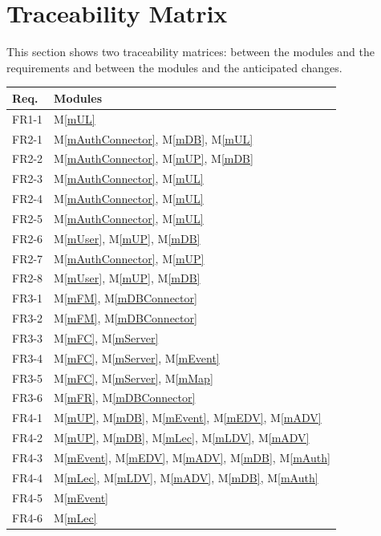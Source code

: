 \documentclass[12pt, titlepage]{article}
\newcommand{\mref}[1]{M\ref{#1}}
\begin{document}
\section{Traceability Matrix} \label{SecTM}

This section shows two traceability matrices: between the modules and the
requirements and between the modules and the anticipated changes.

\begin{table}[H]
\centering
\begin{tabular}{p{} p{}}
\toprule
\textbf{Req.} & \textbf{Modules}\\
\midrule
FR1-1 & \mref{mUL}\\
FR2-1 & \mref{mAuthConnector}, \mref{mDB}, \mref{mUL}\\
FR2-2 & \mref{mAuthConnector}, \mref{mUP}, \mref{mDB}\\
FR2-3 & \mref{mAuthConnector}, \mref{mUL}\\
FR2-4 & \mref{mAuthConnector}, \mref{mUL}\\
FR2-5 & \mref{mAuthConnector}, \mref{mUL}\\
FR2-6 & \mref{mUser}, \mref{mUP}, \mref{mDB}\\
FR2-7 & \mref{mAuthConnector}, \mref{mUP}\\
FR2-8 & \mref{mUser}, \mref{mUP}, \mref{mDB}\\
FR3-1 & \mref{mFM}, \mref{mDBConnector}\\
FR3-2 & \mref{mFM}, \mref{mDBConnector}\\
FR3-3 & \mref{mFC}, \mref{mServer}\\
FR3-4 & \mref{mFC}, \mref{mServer}, \mref{mEvent}\\
FR3-5 & \mref{mFC}, \mref{mServer}, \mref{mMap}\\
FR3-6 & \mref{mFR}, \mref{mDBConnector}\\
FR4-1 & \mref{mUP}, \mref{mDB}, \mref{mEvent}, \mref{mEDV}, \mref{mADV}\\
FR4-2 & \mref{mUP}, \mref{mDB}, \mref{mLec}, \mref{mLDV}, \mref{mADV}\\
FR4-3 & \mref{mEvent}, \mref{mEDV}, \mref{mADV}, \mref{mDB}, \mref{mAuth}\\
FR4-4 & \mref{mLec}, \mref{mLDV}, \mref{mADV}, \mref{mDB}, \mref{mAuth}\\
FR4-5 & \mref{mEvent}\\
FR4-6 & \mref{mLec}\\

\end{tabular}
\end{table}
\end{document}
